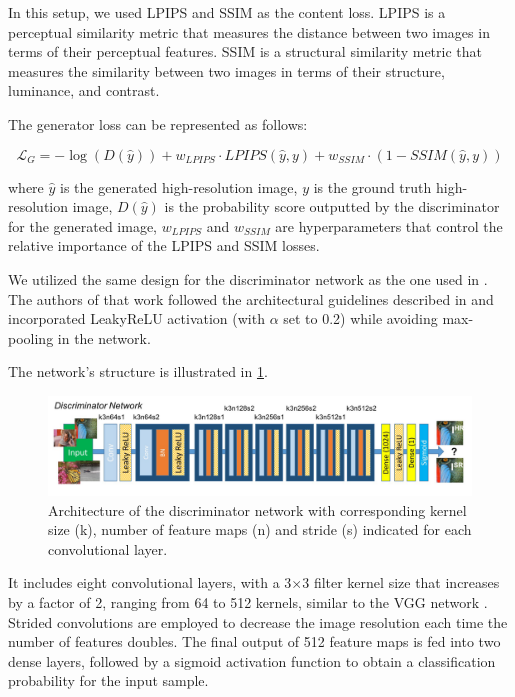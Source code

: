 In this setup, we used LPIPS and SSIM as the content loss. LPIPS is a perceptual similarity metric that measures the distance between two images in terms of their perceptual features. SSIM is a structural similarity metric that measures the similarity between two images in terms of their structure, luminance, and contrast.

The generator loss can be represented as follows:

$$\mathcal{L}_{G} = -\log(D(\hat{y})) + w_{LPIPS}\cdot LPIPS(\hat{y}, y) + w_{SSIM} \cdot (1 - SSIM(\hat{y}, y))$$

where $\hat{y}$ is the generated high-resolution image, $y$ is the ground truth high-resolution image, $D(\hat{y})$ is the probability score outputted by the discriminator for the generated image, $w_{LPIPS}$ and $w_{SSIM}$ are hyperparameters that control the relative importance of the LPIPS and SSIM losses.

We utilized the same design for the discriminator network as the one used in \cite{ledig2017photo}. The authors of that work followed the architectural guidelines described in \cite{radford2015unsupervised} and incorporated LeakyReLU activation (with $\alpha$ set to 0.2) while avoiding max-pooling in the network.

The network's structure is illustrated in \cref{fig:discriminator}.

\begin{figure}[h]
\centering
\includegraphics[width=1.0\textwidth]{static/discriminator_architecture.png}
\caption{Architecture of the discriminator network with corresponding kernel size (k), number of feature maps (n) and stride (s) indicated for each convolutional layer.}
\label{fig:discriminator}
\end{figure}

It includes eight convolutional layers, with a 3$\times$3 filter kernel size that increases by a factor of 2, ranging from 64 to 512 kernels, similar to the VGG network \cite{simonyan2014very}. Strided convolutions are employed to decrease the image resolution each time the number of features doubles. The final output of 512 feature maps is fed into two dense layers, followed by a sigmoid activation function to obtain a classification probability for the input sample.

